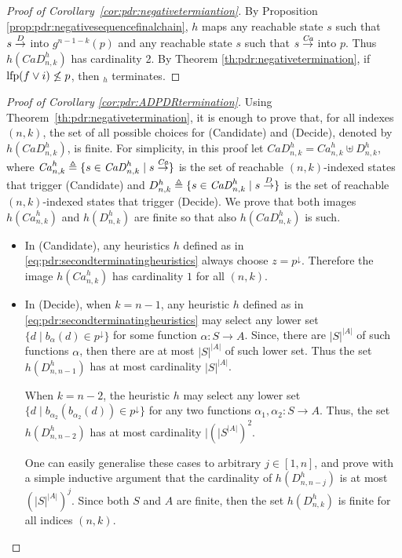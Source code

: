 \begin{proof}[Proof of Corollary~\ref{cor:pdr:negativetermiantion}]
	By Proposition \ref{prop:pdr:negativesequencefinalchain}, $h$ maps any reachable state $s$ such that $s\stackrel{D}{\to}$ into $g^{n-1-k}(p)$ and any reachable state $s$ such that $s\stackrel{\mathit{Ca}}{\to}$ into $p$. Thus $h(\mathit{CaD}^h_{n,k})$ has cardinality 2. By Theorem \ref{th:pdr:negativetermination}, if $\text{lfp}(f\lor i) \not \leq p$, then {\APDR}$_h$ terminates.
\end{proof}

\begin{proof}[Proof of Corollary \ref{cor:pdr:ADPDRtermination}]
	Using Theorem~\ref{th:pdr:negativetermination}, it is enough to prove that, for all indexes $(n,k)$, the set of all possible choices for (Candidate) and (Decide), denoted by $h(\mathit{CaD}^h_{n,k})$, is finite. For simplicity, in this proof let $\mathit{CaD}^h_{n,k} = \mathit{Ca}^h_{n,k} \uplus D^h_{n,k}$, where $\mathit{Ca}^h_{n,k} \triangleq \{ s\in \mathit{CaD}^h_{n,k} \mid s \stackrel{\mathit{Ca}}{\to}\}$ is the set of reachable $(n,k)$-indexed states that trigger (Candidate) and  $D^h_{n,k} \triangleq \{ s\in \mathit{CaD}^h_{n,k} \mid s\stackrel{D}{\to}\}$  is the set of reachable $(n,k)$-indexed states that trigger (Decide).
	We prove that both images $h(\mathit{Ca}^h_{n,k})$ and $h(D^h_{n,k})$ are finite so that also $h(\mathit{CaD}^h_{n,k})$ is such.
	\begin{itemize}
		\item In (Candidate), any heuristics $h$ defined as in \eqref{eq:pdr:secondterminatingheuristics} always choose $z=p^\downarrow$.
		      Therefore the image $h(\mathit{Ca}^h_{n,k})$ has cardinality $1$ for all $(n,k)$.
		\item In (Decide), when $k=n-1$, any heuristic $h$ defined as in  \eqref{eq:pdr:secondterminatingheuristics} may select any lower set $\{d \mid b_\alpha(d)\in p^\downarrow\}$ for some function $\alpha\colon S \to A$. Since, there are $|S|^{|A|}$ of such functions $\alpha$, then there are at most $|S|^{|A|}$ of such lower set. Thus the set $h(D^h_{n,n-1})$ has at most cardinality $|S|^{|A|}$.

		      When $k=n-2$, the heuristic $h$ may select any lower set $\{d \mid b_{\alpha_2}(b_{\alpha_2}(d))\in p^\downarrow\}$ for any two functions $\alpha_1,\alpha_2\colon S \to A$. Thus, the set $h(D^h_{n,n-2})$ has at most cardinality $|(|S^{|A|})^2$.

		      One can easily generalise these cases to arbitrary $j\in [1,n]$, and prove with a simple inductive argument that the cardinality of $h(D^h_{n,n-j})$ is at most $(|S|^{|A|})^j$. Since both $S$ and $A$ are finite, then the set $h(D^h_{n,k})$ is finite for all indices $(n,k)$.
	\end{itemize}
\end{proof}

